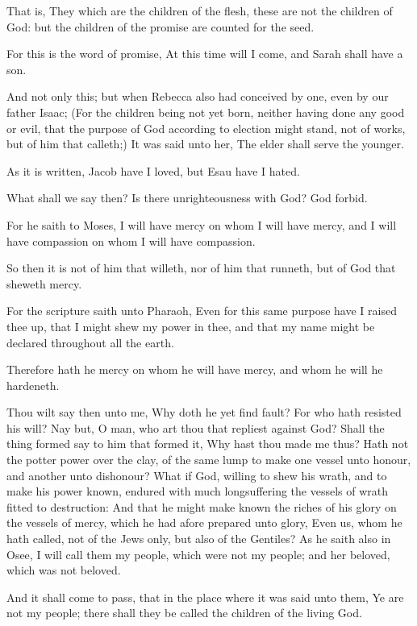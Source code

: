 \verse That is, They which are the children of the flesh, these are not the children of God: but the children of the promise are counted for the seed.

\verse For this is the word of promise, At this time will I come, and Sarah shall have a son.

\verse And not only this; but when Rebecca also had conceived by one, even by our father Isaac; \verse (For the children being not yet born, neither having done any good or evil, that the purpose of God according to election might stand, not of works, but of him that calleth;) \verse It was said unto her, The elder shall serve the younger.

\verse As it is written, Jacob have I loved, but Esau have I hated.

\verse What shall we say then? Is there unrighteousness with God? God forbid.

\verse For he saith to Moses, I will have mercy on whom I will have mercy, and I will have compassion on whom I will have compassion.

\verse So then it is not of him that willeth, nor of him that runneth, but of God that sheweth mercy.

\verse For the scripture saith unto Pharaoh, Even for this same purpose have I raised thee up, that I might shew my power in thee, and that my name might be declared throughout all the earth.

\verse Therefore hath he mercy on whom he will have mercy, and whom he will he hardeneth.

\verse Thou wilt say then unto me, Why doth he yet find fault? For who hath resisted his will?  \verse Nay but, O man, who art thou that repliest against God? Shall the thing formed say to him that formed it, Why hast thou made me thus?  \verse Hath not the potter power over the clay, of the same lump to make one vessel unto honour, and another unto dishonour?  \verse What if God, willing to shew his wrath, and to make his power known, endured with much longsuffering the vessels of wrath fitted to destruction: \verse And that he might make known the riches of his glory on the vessels of mercy, which he had afore prepared unto glory, \verse Even us, whom he hath called, not of the Jews only, but also of the Gentiles?  \verse As he saith also in Osee, I will call them my people, which were not my people; and her beloved, which was not beloved.

\verse And it shall come to pass, that in the place where it was said unto them, Ye are not my people; there shall they be called the children of the living God.

